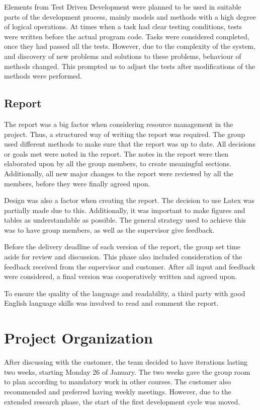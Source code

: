 Elements from Test Driven Development were planned to be used in suitable parts of the development process, mainly models and methods with a high degree of logical operations. At times when a task had clear testing conditions, tests were written before the actual program code. Tasks were considered completed, once they had passed all the tests. However, due to the complexity of the system, and discovery of new problems and solutions to these problems, behaviour of methods changed. This prompted us to adjust the tests after modifications of the methods were performed.

\subsection{Report}

The report was a big factor when considering resource management in the project. Thus, a structured way of writing the report was required. The group used different methods to make sure that the report was up to date. All decisions or goals met were noted in the report. The notes in the report were then elaborated upon by all the group members, to create meaningful sections. Additionally, all new major changes to the report were reviewed by all the members, before they were finally agreed upon.

Design was also a factor when creating the report. The decision to use Latex was partially made due to this. Additionally, it was important to make figures and tables as understandable as possible. The general strategy used to achieve this was to have group members, as well as the supervisor give feedback.

Before the delivery deadline of each version of the report, the group set time aside for review and discussion. This phase also included consideration of the feedback received from the supervisor and customer. After all input and feedback were considered, a final version was cooperatively written and agreed upon.

To ensure the quality of the language and readability, a third party with good English language skills was involved to read and comment the report.

\section{Project Organization}

After discussing with the customer, the team decided to have iterations lasting two weeks, starting Monday 26 of January. The two weeks gave the group room to plan according to mandatory work in other courses. The customer also recommended and preferred having weekly meetings. However, due to the extended research phase, the start of the first development cycle was moved.

